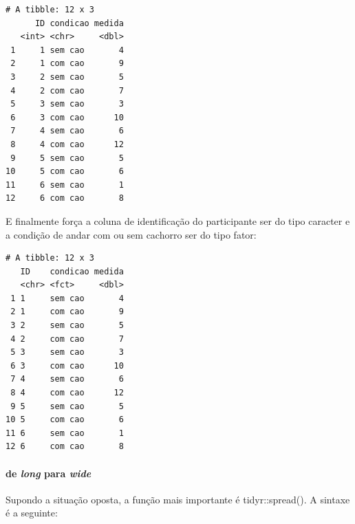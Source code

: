 \documentclass[
]{article}
\newenvironment{Shaded}{\begin{snugshade}}{\end{snugshade}}
\newcommand{\CommentTok}[1]{\textcolor[rgb]{0.56,0.35,0.01}{\textit{#1}}}
\newcommand{\FunctionTok}[1]{\textcolor[rgb]{0.00,0.00,0.00}{#1}}
\newcommand{\NormalTok}[1]{#1}
\newcommand{\OtherTok}[1]{\textcolor[rgb]{0.56,0.35,0.01}{#1}}
\newcommand{\SpecialCharTok}[1]{\textcolor[rgb]{0.00,0.00,0.00}{#1}}
\begin{document}
\begin{verbatim}
# A tibble: 12 x 3
      ID condicao medida
   <int> <chr>     <dbl>
 1     1 sem cao       4
 2     1 com cao       9
 3     2 sem cao       5
 4     2 com cao       7
 5     3 sem cao       3
 6     3 com cao      10
 7     4 sem cao       6
 8     4 com cao      12
 9     5 sem cao       5
10     5 com cao       6
11     6 sem cao       1
12     6 com cao       8
\end{verbatim}

E finalmente força a coluna de identificação do participante ser do tipo
caracter e a condição de andar com ou sem cachorro ser do tipo fator:

\begin{Shaded}
\end{Shaded}

\begin{verbatim}
# A tibble: 12 x 3
   ID    condicao medida
   <chr> <fct>     <dbl>
 1 1     sem cao       4
 2 1     com cao       9
 3 2     sem cao       5
 4 2     com cao       7
 5 3     sem cao       3
 6 3     com cao      10
 7 4     sem cao       6
 8 4     com cao      12
 9 5     sem cao       5
10 5     com cao       6
11 6     sem cao       1
12 6     com cao       8
\end{verbatim}

\hypertarget{de-long-para-wide}{%
\paragraph{\texorpdfstring{de \emph{long} para
\emph{wide}}{de long para wide}}\label{de-long-para-wide}}

Supondo a situação oposta, a função mais importante é tidyr::spread(). A
sintaxe é a seguinte:
\end{document}
